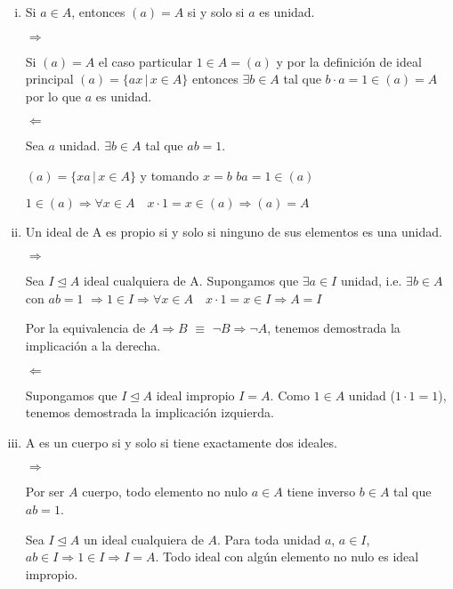 \documentclass[10pt,a4paper]{article}
\begin{document}
	\begin{enumerate}[(i)]
		\item Si $a\in A$, entonces $(a)=A$ si y solo si $a$ es unidad.
		
		
		$\Rightarrow$
		
		Si $(a)=A$ el caso particular $1\in A = (a)$ y por la definición de ideal principal $(a) = \{ ax \, \vert \, x\in A \}$ entonces $\exists b \in A$ tal que $b\cdot a = 1 \in (a) = A$ por lo que $a$ es unidad.
		
		\hfill
		
		$\Leftarrow$
		
		Sea $a$ unidad. $\exists b \in A$ tal que $ab=1$.
		
		$(a) = \{ xa \, \vert \, x\in A \}$ y tomando $x=b$ $ba=1 \in (a)$
	
		$1 \in (a) \Rightarrow \forall x \in A \quad x\cdot 1 = x \in (a) \Rightarrow (a) = A$	
		
		\hfill
		
		
		\item Un ideal de A es propio si y solo si ninguno de sus elementos es una unidad.
		
		$\Rightarrow$
		
		Sea $I \trianglelefteq A$ ideal cualquiera de A.
		Supongamos  que $\exists a \in I$ unidad, i.e. $\exists b \in A$ con $ab=1$ $\Rightarrow 1\in I \Rightarrow  \forall x \in A \quad x\cdot 1 = x \in I \Rightarrow A = I $
		
		Por la equivalencia de $A \Rightarrow B$ $\equiv$ $\neg B \Rightarrow \neg A$, tenemos demostrada la implicación a la derecha.
		
		
		
		
		\hfill
		
		
		$\Leftarrow$
		
		Supongamos que $I \trianglelefteq A$ ideal impropio $I=A$. Como $1 \in A$ unidad ($1\cdot 1 = 1$), tenemos demostrada la implicación izquierda. 
		
		
		
		\hfill
		
		
		\item A es un cuerpo si y solo si tiene exactamente dos ideales.
		
		$\Rightarrow$
		
		Por ser $A$ cuerpo, todo elemento no nulo $a\in A$ tiene inverso $b\in A$ tal que $ab=1$.
		
		Sea $I \trianglelefteq A$ un ideal cualquiera de $A$. Para toda unidad $a$,  $a \in I$, $ab \in I \Rightarrow 1 \in I \Rightarrow I=A$. Todo ideal con algún elemento no nulo es ideal impropio.
		

\end{enumerate}
\end{document}
